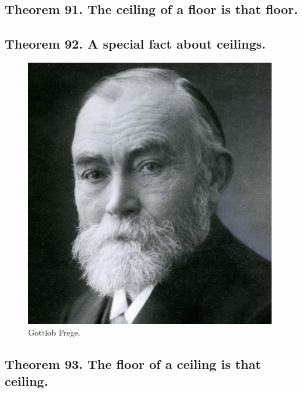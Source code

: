 \documentclass[preview]{standalone}
\begin{document}
\subsection[The ceiling of a floor is that floor.]
    {
        \color{section}Theorem 91. \color{black} The ceiling of a floor is that floor.
    }

\pagebreak


\subsection[A special fact about ceilings.]
    {
        \color{section}Theorem 92. \color{black} A special fact about ceilings.
    }

\pagebreak


\begin{figure}[!h]
    \centering
    \includegraphics[width=11cm]{../resources/jpg/2.3.functions/frege.jpg}
    \caption*{Gottlob Frege.}
\end{figure}
\subsection[The floor of a ceiling is that ceiling.]
    {
        \color{section}Theorem 93. \color{black} The floor of a ceiling is that ceiling.
    }

\pagebreak
\end{document}
